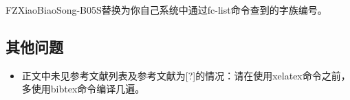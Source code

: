 \noindent FZXiaoBiaoSong-B05S替换为你自己系统中通过fc-list命令查到的字族编号。
\subsection{其他问题}
\begin{itemize}
    \item 正文中未见参考文献列表及参考文献为[?]的情况：请在使用xelatex命令之前，多使用bibtex命令编译几遍。
\end{itemize}
